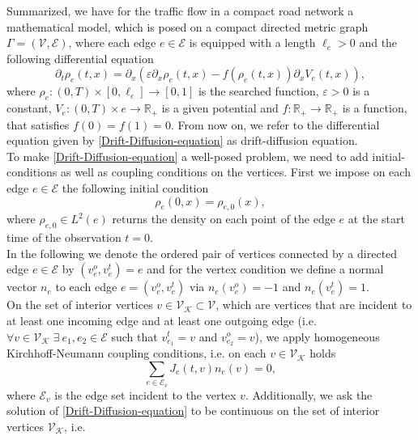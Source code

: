 Summarized, we have for the traffic flow in a compact road network a mathematical model, which is posed on a compact directed metric graph $\Gamma = (\mathcal{V}, \mathcal{E})$, where each edge $e \in \mathcal{E}$ is equipped with a length $\ell_e > 0$ and the following differential equation
\begin{equation} 
    \label{Drift-Diffusion-equation}
    \partial_t \rho_e (t,x) = \partial_x (\varepsilon \partial_x \rho_e (t,x) - f(\rho_e (t,x) ) \partial_x V_e (t,x)),
\end{equation}
where $\rho_e \colon (0, T) \times [0, \ell_e] \to [0, 1]$ is the searched function, $\varepsilon > 0$ is a constant, $V_e \colon (0,T) \times e \to \mathbb{R}_{+}$ is a given potential and $f \colon \mathbb{R}_{+} \to \mathbb{R}_{+}$ is a function, that satisfies $f(0) = f(1) = 0$. From now on, we refer to the differential equation given by \cref{Drift-Diffusion-equation} as drift-diffusion equation. \\
To make \cref{Drift-Diffusion-equation} a well-posed problem, we need to add initial-conditions as well as coupling conditions on the vertices. First we impose on each edge $e \in \mathcal{E}$ the following initial condition
\begin{equation}
    \label{eq:initial_conditions}
    \rho_e(0,x) = \rho_{e, 0}(x),
\end{equation}
where $\rho_{e, 0} \in L^2(e)$ returns the density on each point of the edge $e$ at the start time of the observation $t=0$. \\ 
In the following we denote the ordered pair of vertices connected by a directed edge $e \in \mathcal{E}$ by $(v^{o}_e, v^{t}_e) = e$ and for the vertex condition we define a normal vector $n_e$ to each edge $e = (v^{o}_e, v^{t}_e)$ via $n_e(v^{o}_e) = -1$ and $n_e(v^{t}_e) = 1$. \\
On the set of interior vertices $v \in \mathcal{V}_\mathcal{K} \subset \mathcal{V}$, which are vertices that are incident to at least one incoming edge and at least one outgoing edge (i.e. $\forall v \in \mathcal{V}_\mathcal{K} \; \exists \ e_1, e_2 \in \mathcal{E}$ such that $v^{t}_{e_1} = v$ and $v^{o}_{e_2} = v$), we apply homogeneous Kirchhoff-Neumann coupling conditions, i.e. on each $v \in \mathcal{V}_\mathcal{K}$ holds
\begin{equation}
    \label{eq:Kirchhoff_Neumann_condition}
    \sum_{e\in \mathcal{E}_v} J_e(t,v) n_e (v)=0,
\end{equation}
where $\mathcal{E}_v$ is the edge set incident to the vertex $v$. Additionally, we ask the solution of \cref{Drift-Diffusion-equation} to be continuous on the set of interior vertices $\mathcal{V}_\mathcal{K}$, i.e. 
